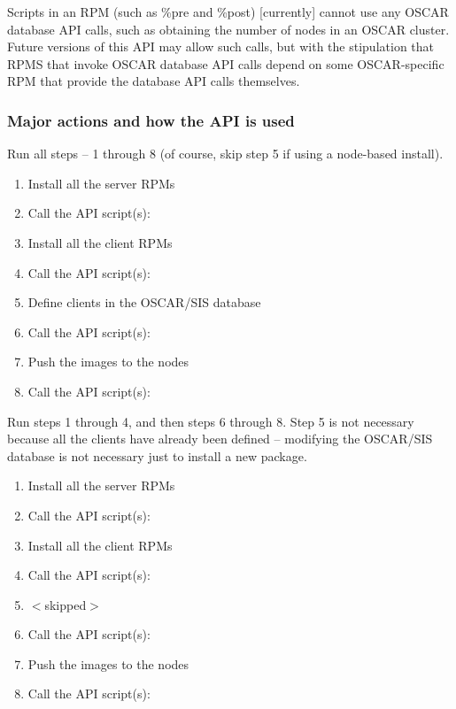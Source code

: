 Scripts in an RPM (such as \%pre and \%post) [currently] cannot use any
OSCAR database API calls, such as obtaining the number of nodes in an
OSCAR cluster.  Future versions of this API may allow such calls, but
with the stipulation that RPMS that invoke OSCAR database API calls
depend on some OSCAR-specific RPM that provide the database API calls
themselves.


\subsubsection{Major actions and how the API is used}


Run all steps -- 1 through 8 (of course, skip step 5 if using a
node-based install).

\begin{enumerate}
\item Install all the server RPMs
\item Call the API script(s): 
\item Install all the client RPMs
\item Call the API script(s): 
\item Define clients in the OSCAR/SIS database
\item Call the API script(s): 
\item Push the images to the nodes
\item Call the API script(s): 
\end{enumerate}


Run steps 1 through 4, and then steps 6 through 8.  Step 5 is not
necessary because all the clients have already been defined --
modifying the OSCAR/SIS database is not necessary just to install a
new package.

\begin{enumerate}
\item Install all the server RPMs
\item Call the API script(s): 
\item Install all the client RPMs
\item Call the API script(s): 
\item $<$skipped$>$
\item Call the API script(s): 
\item Push the images to the nodes
\item Call the API script(s): 
\end{enumerate}

